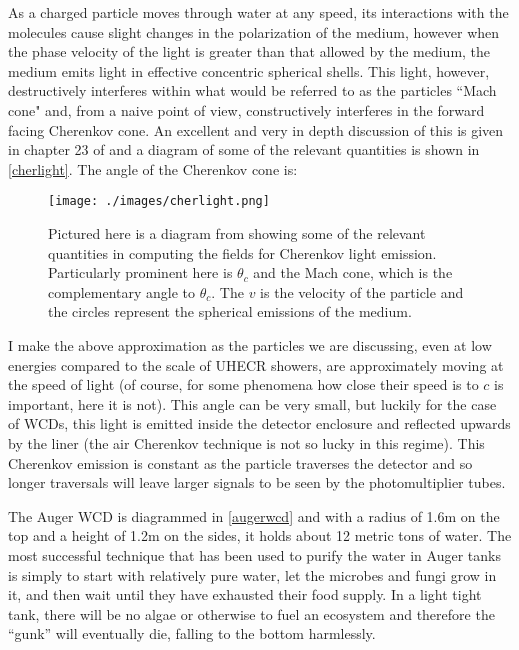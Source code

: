 As a charged particle moves through water at any speed, its interactions with the molecules cause slight changes in the polarization of the medium, however when the phase velocity of the light is greater than that allowed by the medium, the medium emits light in effective concentric spherical shells. This light, however, destructively interferes within what would be referred to as the particles ``Mach cone" and, from a naive point of view, constructively interferes in the forward facing Cherenkov cone. An excellent and very in depth discussion of this is given in chapter 23 of \textcite{zangwill} and a diagram of some of the relevant quantities is shown in \autoref{cherlight}. The angle of the Cherenkov cone is:
\begin{figure}[h!]
\begin{center}
\texttt{[image: ./images/cherlight.png]}
\caption[Cherenkov Light Diagram]{Pictured here is a diagram from \textcite{zangwill} showing some of the relevant quantities in computing the fields for Cherenkov light emission. Particularly prominent here is $\theta_c$ and the Mach cone, which is the complementary angle to $\theta_c$. The $v$ is the velocity of the particle and the circles represent the spherical emissions of the medium.}
\label{cherlight}
\end{center}
\end{figure}
I make the above approximation as the particles we are discussing, even at low energies compared to the scale of UHECR showers, are approximately moving at the speed of light (of course, for some phenomena how close their speed is to $c$ is important, here it is not). This angle can be very small, but luckily for the case of WCDs, this light is emitted inside the detector enclosure and reflected upwards by the liner (the air Cherenkov technique is not so lucky in this regime). This Cherenkov emission is constant as the particle traverses the detector and so longer traversals will leave larger signals to be seen by the photomultiplier tubes.

The Auger WCD is diagrammed in \autoref{augerwcd} and with a radius of 1.6m on the top and a height of 1.2m on the sides, it holds about 12 metric tons of water. The most successful technique that has been used to purify the water in Auger tanks is simply to start with relatively pure water, let the microbes and fungi grow in it, and then wait until they have exhausted their food supply. In a light tight tank, there will be no algae or otherwise to fuel an ecosystem and therefore the ``gunk'' will eventually die, falling to the bottom harmlessly. 

